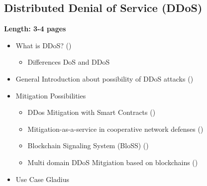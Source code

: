 \subsection{Distributed Denial of Service (DDoS)}
\label{subsec:03_ddos}

\textbf{Length: 3-4 pages}

\begin{itemize}
  \item What is DDoS? (\cite{Bishop2004})
  \begin{itemize}
    \item Differences DoS and DDoS
  \end{itemize}
  \item General Introduction about possibility of DDoS attacks (\cite{Bishop2004})
  \item Mitigation Possibilities
  \begin{itemize}
    \item DDos Mitigation with Smart Contracts (\cite{Rodrigues2017})
    \item Mitigation-as-a-service in cooperative network defenses (\cite{Mannhart2018})
    \item Blockchain Signaling System (BloSS) (\cite{Rodrigues2019})
    \item Multi domain DDoS Mitgiation based on blockchains (\cite{Rodrigues2017a})
  \end{itemize}
  \item Use Case Gladius
\end{itemize}
